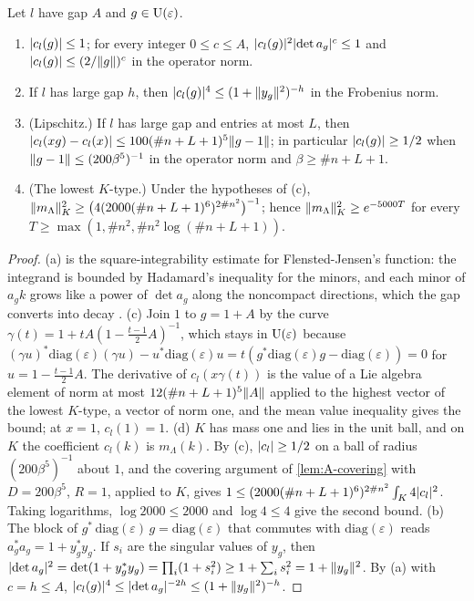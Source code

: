 \begin{proposition}\label{prop:A-decay}
Let $l$ have gap $A$ and $g\in\operatorname{U}(\varepsilon)$.
\begin{enumerate}[label=\textup{(\alph*)}]
\item $\lvert c_l(g)\rvert\le1$; for every integer $0\le c\le A$, $\lvert c_l(g)\rvert^2\lvert \det a_g\rvert^c\le1$ and $\lvert c_l(g)\rvert\le(2/\lVert g\rVert)^c$ in the operator norm.
\item If $l$ has large gap $h$, then $\lvert c_l(g)\rvert^4\le(1+\lVert y_g\rVert^2)^{-h}$ in the Frobenius norm.
\item (Lipschitz.) If $l$ has large gap and entries at most $L$, then $\lvert c_l(xg)-c_l(x)\rvert\le100(\#n+L+1)^5\lVert g-1\rVert$; in particular $\lvert c_l(g)\rvert\ge1/2$ when $\lVert g-1\rVert\le(200\beta^5)^{-1}$ in the operator norm and
$\beta\ge\#n+L+1$.
\item (The lowest $K$-type.) Under the hypotheses of (c), $\lVert m_\Lambda\rVert^2_K\ge\bigl(4(2000(\#n+L+1)^6)^{2\#n^2}\bigr)^{-1}$; hence $\lVert m_\Lambda\rVert^2_K\ge e^{-5000T}$ for every $T\ge\max(1,\#n^2,\#n^2\log(\#n+L+1))$.
\end{enumerate}
\end{proposition}

\begin{proof}
(a) is the square-integrability estimate for Flensted-Jensen's function: the integrand is bounded by Hadamard's inequality for the minors, and each minor of $a_gk$ grows like a power of $\det a_g$ along the
noncompact directions, which the gap converts into decay \cite{FlenstedJensen1980}. (c) Join $1$ to $g=1+A$ by the curve $\gamma(t)=1+tA(1-\frac{t-1}2A)^{-1}$, which stays in $\operatorname{U}(\varepsilon)$ because $(\gamma u)^*\mathrm{diag}(\varepsilon)(\gamma u)-u^*\mathrm{diag}(\varepsilon)u=t(g^*\mathrm{diag}(\varepsilon)g-\mathrm{diag}(\varepsilon))=0$ for
$u=1-\frac{t-1}2A$. The derivative of $c_l(x\gamma(t))$ is the value of a Lie algebra element of norm at most $12(\#n+L+1)^5\lVert A\rVert$ applied to the highest vector of the lowest $K$-type, a vector of norm one, and the mean value
inequality gives the bound; at $x=1$, $c_l(1)=1$. (d) $K$ has mass one and lies in the unit ball, and on $K$ the coefficient $c_l(k)$ is $m_\Lambda(k)$. By (c), $\lvert c_l\rvert\ge1/2$ on a ball of radius $(200\beta^5)^{-1}$ about $1$, and the covering
argument of \cref{lem:A-covering} with $D=200\beta^5$, $R=1$, applied to $K$, gives $1\le(2000(\#n+L+1)^6)^{2\#n^2}\int_K4\lvert c_l\rvert^2$. Taking logarithms, $\log2000\le2000$ and $\log4\le4$ give the second bound. (b) The block of $g^*\,\mathrm{diag}(\varepsilon)\,g=\mathrm{diag}(\varepsilon)$ that commutes with $\mathrm{diag}(\varepsilon)$ reads $a_g^*a_g=1+y_g^*y_g$. If $s_i$ are the singular values of $y_g$, then
$\lvert \det a_g\rvert^2=\det(1+y_g^*y_g)=\prod_i(1+s_i^2)\ge1+\sum_is_i^2=1+\lVert y_g\rVert^2$. By (a) with $c=h\le A$, $\lvert c_l(g)\rvert^4\le\lvert \det a_g\rvert^{-2h}\le(1+\lVert y_g\rVert^2)^{-h}$.
\end{proof}

